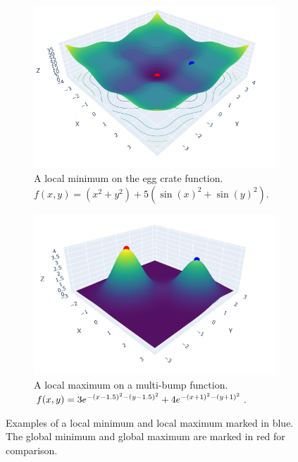 \begin{figure}[h]
    \begin{subfigure}[b]{0.48\linewidth}
        \centering
        \includegraphics[width=\linewidth]{figures/2background/local_min.png}
        \caption{A local minimum on the egg crate function. \\
        $f(x,y) = (x^2 + y^2) + 5 (\sin(x)^2 + \sin(y)^2)$.
        }
        \label{fig:local_min}
    \end{subfigure}
    \hfill
    \begin{subfigure}[b]{0.48\linewidth}
        \centering
        \includegraphics[width=\linewidth]{figures/2background/local_max.png}
        \caption{A local maximum on a multi-bump function. \\
        $f(x,y) = 3 e^{-(x-1.5)^2 - (y-1.5)^2} + \\
         4 e^{-(x+1)^2 - (y+1)^2}$.}
        \label{fig:local_max}
    \end{subfigure}
    \caption{Examples of a local minimum and local maximum marked in blue. The global minimum and global maximum are marked in red for comparison.}
    \label{fig:local_min_max}
\end{figure}

